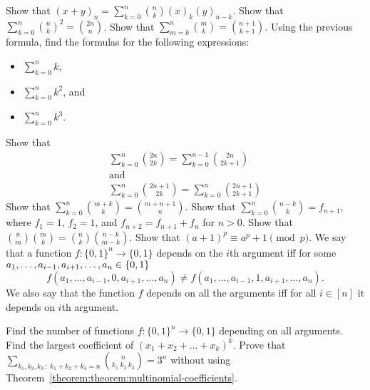 \begin{chapterendexercises}
  \exercise Show that
    $(x + y)_n = \sum_{k = 0}^n \binom{n}{k} (x)_k (y)_{n - k}$.
  \exercise Show that
    $\sum_{k = 0}^n \binom{n}{k}^2 = \binom{2n}{n}$.
  \exercise Show that $\sum_{m = k}^n \binom{m}{k} =
    \binom{n + 1}{k + 1}$.
  \exercise Using the previous formula, find the formulas for the following
    expressions:
    \begin{itemize}
      \item $\sum_{k = 0}^n k$,
      \item $\sum_{k = 0}^n k^2$, and
      \item $\sum_{k = 0}^n k^3$.
    \end{itemize}
  \exercise Show that
    \begin{gather*}
      \sum_{k = 0}^{n} \binom{2n}{2k} =
      \sum_{k = 0}^{n - 1} \binom{2n}{2k + 1} \\
      \text{and} \\
      \sum_{k = 0}^{n} \binom{2n + 1}{2k} =
      \sum_{k = 0}^n \binom{2n + 1}{2k + 1}
    \end{gather*}
  \exercise Show that $\sum_{k = 0}^n \binom{m + k}{k} =
    \binom{m + n + 1}{n}$.
  \exercise Show that $\sum_{k = 0}^n \binom{n - k}{k} = f_{n + 1}$,
    where $f_1 = 1$, $f_2 = 1$, and $f_{n + 2} = f_{n + 1} + f_n$ for $n > 0$.
  \exercise Show that $\binom{n}{m} \binom{m}{k} =
    \binom{n}{k} \binom{n - k}{m - k}$.
  \exercise Show that
    $(a + 1)^p \equiv a^p + 1 \pmod{p}$.
  \exercise We say that a function $f : \{0, 1\}^n \to \{0, 1\}$ depends on the
    $i$th argument iff for some
    $a_1, \dots, a_{i - 1}, a_{i + 1}, \dots, a_n \in \set{0, 1}$
    \[
      f(a_1, \dots, a_{i - 1}, 0, a_{i + 1}, \dots, a_n) \neq
      f(a_1, \dots, a_{i - 1}, 1, a_{i + 1}, \dots, a_n).
    \]
    We also say that the function $f$ depends on all the arguments iff for all $i
    \in [n]$ it depends on $i$th argument.

    Find the number of functions $f : \{0, 1\}^n \to \{0, 1\}$ depending on all
    arguments.
  \exercise Find the largest coefficient of $(x_1 + x_2 + \dots + x_k)^k$.
  \exercise Prove that
    $\sum_{k_1, k_2, k_3 ~:~ k_1 + k_2 + k_3 = n} \binom{n}{k_1 \ k_2 \ k_3} =
    3^n$ without using Theorem~\ref{theorem:theorem:multinomial-coefficients}.
\end{chapterendexercises}
